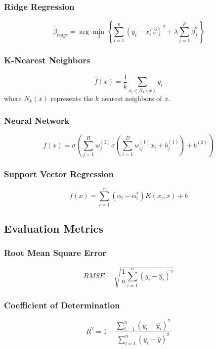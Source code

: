 \subsubsection{Ridge Regression}
\begin{equation}
\hat{\beta}_{ridge} = \arg\min_{\beta} \left\{ \sum_{i=1}^{n} (y_i - x_i^T\beta)^2 + \lambda \sum_{j=1}^{p} \beta_j^2 \right\}
\end{equation}

\subsubsection{K-Nearest Neighbors}
\begin{equation}
\hat{f}(x) = \frac{1}{k} \sum_{x_i \in N_k(x)} y_i
\end{equation}
where $N_k(x)$ represents the $k$ nearest neighbors of $x$.

\subsubsection{Neural Network}
\begin{equation}
f(x) = \sigma\left( \sum_{j=1}^{H} w_j^{(2)} \sigma\left( \sum_{i=1}^{D} w_{ij}^{(1)} x_i + b_j^{(1)} \right) + b^{(2)} \right)
\end{equation}

\subsubsection{Support Vector Regression}
\begin{equation}
f(x) = \sum_{i=1}^{n} (\alpha_i - \alpha_i^*) K(x_i, x) + b
\end{equation}

\subsection{Evaluation Metrics}

\subsubsection{Root Mean Square Error}
\begin{equation}
RMSE = \sqrt{\frac{1}{n} \sum_{i=1}^{n} (y_i - \hat{y}_i)^2}
\end{equation}

\subsubsection{Coefficient of Determination}
\begin{equation}
R^2 = 1 - \frac{\sum_{i=1}^{n} (y_i - \hat{y}_i)^2}{\sum_{i=1}^{n} (y_i - \bar{y})^2}
\end{equation}
